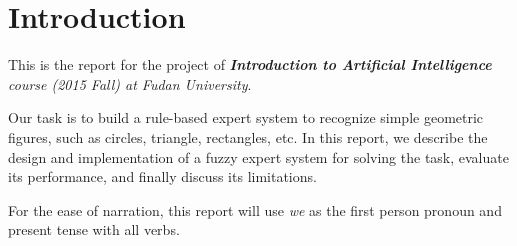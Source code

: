 \section{Introduction}

This is the report for the project of \textit{\textbf{Introduction to Artificial Intelligence} course (2015 Fall) at Fudan University}.

Our task is to build a rule-based expert system to recognize simple geometric figures, such as circles, triangle, rectangles, etc. In this report, we describe the design and implementation of a fuzzy expert system for solving the task, evaluate its performance, and finally discuss its limitations.

For the ease of narration, this report will use \textit{we} as the first person pronoun and present tense with all verbs.
